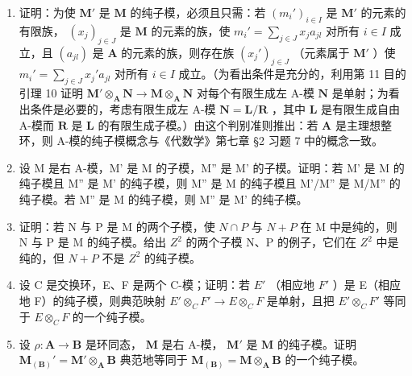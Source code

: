 \begin{enumerate}
\def\labelenumi{(\alph{enumi})}
\item
  证明：为使 \(\mathbf{M}'\) 是 \(\mathbf{M}\) 的纯子模，必须且只需：若 \((m_i')_{i\in I}\) 是 \(\mathbf{M}'\) 的元素的有限族， \((x_j)_{j\in J}\) 是 \(\mathbf{M}\) 的元素的族，使 \(m_i' = \sum_{j\in J} x_j a_{jl}\) 对所有 \(i\in I\) 成立，且 \((a_{jl})\) 是 \(\mathbf{A}\) 的元素的族，则存在族 \((x_j')_{j\in J}\) （元素属于 \(\mathbf{M}'\) ）使 \(m_i' = \sum_{j\in J} x_j' a_{jl}\) 对所有 \(i\in I\) 成立。（为看出条件是充分的，利用第 11 目的引理 10 证明 \(\mathbf{M}' \otimes_{\mathbf{A}} \mathbf{N} \to \mathbf{M} \otimes_{\mathbf{A}} \mathbf{N}\) 对每个有限生成左 A-模 \(\mathbf{N}\) 是单射；为看出条件是必要的，考虑有限生成左 A-模 \(\mathbf{N} = \mathbf{L}/\mathbf{R}\) ，其中 \(\mathbf{L}\) 是有限生成自由 A-模而 \(\mathbf{R}\) 是 \(\mathbf{L}\) 的有限生成子模。）由这个判别准则推出：若 \(\mathbf{A}\) 是主理想整环，则 A-模的纯子模概念与《代数学》第七章 §2 习题 7 中的概念一致。
\item
  设 M 是右 A-模，M' 是 M 的子模，M'' 是 M' 的子模。证明：若 M' 是 M 的纯子模且 M'' 是 M' 的纯子模，则 M'' 是 M 的纯子模且 M'/M'' 是 M/M'' 的纯子模。若 M'' 是 M 的纯子模，则 M'' 是 M' 的纯子模。
\item
  证明：若 N 与 P 是 M 的两个子模，使 \(N \cap P\) 与 \(N + P\) 在 M 中是纯的，则 N 与 P 是 M 的纯子模。给出 \(Z^{2}\) 的两个子模 N、P 的例子，它们在 \(Z^{2}\) 中是纯的，但 \(N + P\) 不是 \(Z^{2}\) 的纯子模。
\item
  设 C 是交换环，E、F 是两个 C-模；证明：若 \(E'\) （相应地 \(F'\) ）是 E（相应地 F）的纯子模，则典范映射 \(E' \otimes_{C} F' \to E \otimes_{C} F\) 是单射，且把 \(E' \otimes_{C} F'\) 等同于 \(E \otimes_{C} F\) 的一个纯子模。
\item
  设 \(\rho: \mathbf{A} \to \mathbf{B}\) 是环同态， \(\mathbf{M}\) 是右 A-模， \(\mathbf{M}'\) 是 \(\mathbf{M}\) 的纯子模。证明 \(\mathbf{M}_{(\mathbf{B})}' = \mathbf{M}' \otimes_{\mathbf{A}} \mathbf{B}\) 典范地等同于 \(\mathbf{M}_{(\mathbf{B})} = \mathbf{M} \otimes_{\mathbf{A}} \mathbf{B}\) 的一个纯子模。
\end{enumerate}

